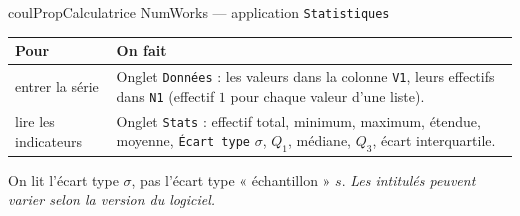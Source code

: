 \documentclass[11pt,a4paper]{article}
\makeatletter
\newcounter{lycee@signet}
\newcommand{\signet}[3][]{\stepcounter{lycee@signet}%
  \edef\lycee@dest{\if\relax\detokenize{#1}\relax
    signet.\arabic{lycee@signet}\else#1\fi}%
  \hypertarget{\lycee@dest}{}\bookmark[level=#2,dest=\lycee@dest]{#3}}
\newenvironment{proprietebox}[1][Propriété]%
  {\begin{boitecours}[phantom={\signet{2}{#1}}]{coulProp}{#1}}{\end{boitecours}}
\makeatother
\begin{document}
\begin{proprietebox}[Calculatrice NumWorks --- application \texttt{Statistiques}]
\begin{center}
\renewcommand{\arraystretch}{1.3}
\begin{tabular}{|>{\raggedright\arraybackslash}p{4.3cm}|>{\raggedright\arraybackslash}p{12.3cm}|}
\hline
\textbf{Pour} & \textbf{On fait}\\\hline
entrer la série & Onglet \texttt{Données} : les valeurs dans la colonne \texttt{V1},
  leurs effectifs dans \texttt{N1} (effectif $1$ pour chaque valeur d'une
  liste).\\\hline
lire les indicateurs & Onglet \texttt{Stats} : effectif total, minimum, maximum,
  étendue, moyenne, \texttt{Écart type} $\sigma$, $Q_1$, médiane, $Q_3$, écart
  interquartile.\\\hline
\end{tabular}
\end{center}
On lit l'écart type $\sigma$, pas l'écart type « échantillon » $s$.
{\footnotesize\itshape Les intitulés peuvent varier selon la version du logiciel.}
\end{proprietebox}
\end{document}
